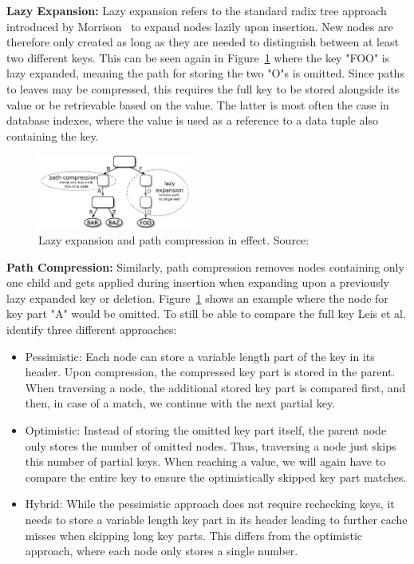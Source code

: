 \documentclass[acmtog, nonacm]{acmart}
\begin{document}
\textbf{Lazy Expansion:} 
Lazy expansion refers to the standard radix tree approach introduced by Morrison~\cite{10.1145/321479.321481} to 
expand nodes lazily upon insertion. New nodes are therefore only created as long as they are needed to distinguish between at least two different keys. This can be seen
again in Figure~\ref{fig:art-vertical-compression} where the key "FOO" is lazy expanded, meaning the path for storing the
two "O"s is omitted. Since paths to leaves may be compressed, this requires the full key to be stored alongside its value 
or be retrievable based on the value. The latter is most often the case in database indexes, where the value 
is used as a reference to a data tuple also containing the key.

\begin{figure}
    \centering
    \includegraphics[width=0.45\textwidth]{images/04-art-vertical-compression.PNG}
    \caption{Lazy expansion and path compression in effect.
    Source:~\cite{6544812}}
    \label{fig:art-vertical-compression}
\end{figure}

\textbf{Path Compression:}
Similarly, path compression removes nodes containing only one child and gets applied during insertion when expanding 
upon a previously lazy expanded key or deletion. Figure~\ref{fig:art-vertical-compression} shows an example where 
the node for key part "A" would be omitted. To still be able to compare the full key Leis et al. identify three different approaches:
\begin{itemize}
    \item Pessimistic: Each node can store a variable length part of the key in its header. 
    Upon compression, the compressed key part is stored in the parent. When traversing a node, the additional
    stored key part is compared first, and then, in case of a match, we continue with the next partial key.
    \item Optimistic: Instead of storing the omitted key part itself, the parent node only stores the number of 
    omitted nodes. Thus, traversing a node just skips this number of partial keys. When reaching a value, we will 
    again have to compare the entire key to ensure the optimistically skipped key part matches.
    \item Hybrid: While the pessimistic approach does not require rechecking keys, it needs to store a variable length 
    key part in its header leading to further cache misses when skipping long key parts. This differs from the 
    optimistic approach, where each node only stores a single number.
\end{itemize}
\end{document}
